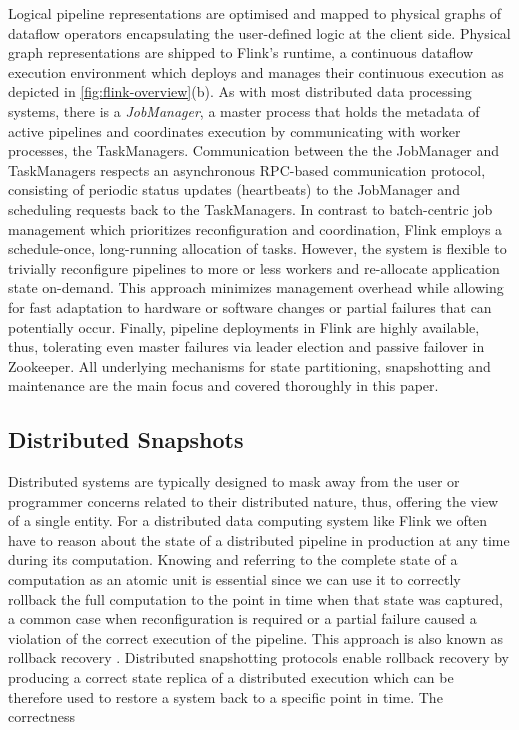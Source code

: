Logical pipeline representations are optimised and mapped to physical graphs of dataflow operators encapsulating the user-defined logic at the client side. Physical graph representations are shipped to Flink's runtime, a continuous dataflow execution environment which deploys and manages their continuous execution as depicted in \autoref{fig:flink-overview}(b). As with most distributed data processing systems, there is a \emph{JobManager}, a master process that holds the metadata of active pipelines and coordinates execution by communicating with worker processes, the TaskManagers. Communication between the the JobManager and TaskManagers respects an asynchronous RPC-based communication protocol, consisting of periodic status updates (heartbeats) to the JobManager and scheduling requests back to the TaskManagers. In contrast to batch-centric job management \cite{zaharia2012discretized,venkataramandrizzle} which prioritizes reconfiguration and coordination, Flink employs a schedule-once, long-running allocation of tasks. However, the system is flexible to trivially reconfigure pipelines to more or less workers and re-allocate application state on-demand. This approach minimizes management overhead while allowing for fast adaptation to hardware or software changes or partial failures that can potentially occur. Finally, pipeline deployments in Flink are highly available, thus, tolerating even master failures via leader election and passive failover in Zookeeper. All underlying mechanisms for state partitioning, snapshotting and maintenance are the main focus and covered thoroughly in this paper.


\subsection{Distributed Snapshots}

Distributed systems are typically designed to mask away from the user or programmer concerns related to their distributed nature, thus, offering the view of a single entity. For a distributed data computing system like Flink we often have to reason about the state of a distributed pipeline in production at any time during its computation. Knowing and referring to the complete state of a computation as an atomic unit is essential since we can use it to correctly rollback the full computation to the point in time when that state was captured, a common case when reconfiguration is required or a partial failure caused a violation of the correct execution of the pipeline. This approach is also known as rollback recovery \cite{elnozahy2002survey}. Distributed snapshotting \cite{chandy1985distributed} protocols enable rollback recovery by producing a correct state replica of a distributed execution which can be therefore used to restore a system back to a specific point in time. The correctness  

